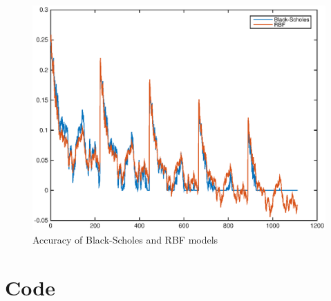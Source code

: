\documentclass[12pt]{article}
\begin{document}
  \begin{figure}
    \centering
    \includegraphics[width=0.75\linewidth]{figures/4.eps}
    \caption{Accuracy of Black-Scholes and RBF models}
    \label{fig:accuracy}
  \end{figure}

  \clearpage
  \appendix

  \section{Code}
\end{document}
